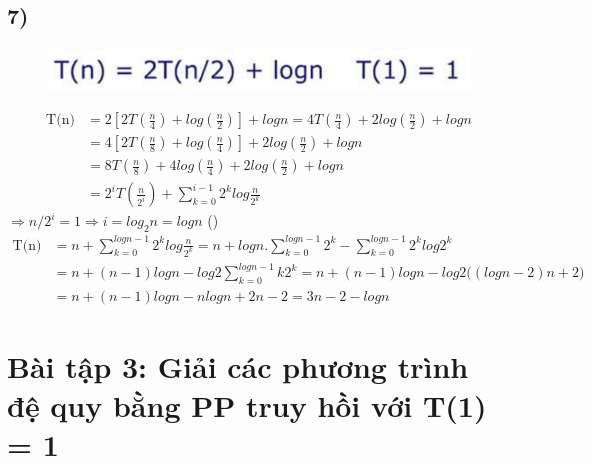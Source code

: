 \documentclass[10pt,a4paper]{article}
\begin{document}
\subsection*{7)}
\begin{figure}[H]
    \centering
    \includegraphics[scale=.7]{images/27.png}
    \label{fig:my_label}
\end{figure}
\begin{align*}
    \text{T(n)}
    & = 2[2T(\frac{n}{4})+log(\frac{n}{2})] + logn = 4T(\frac{n}{4}) + 2log(\frac{n}{2}) + logn \\
    & = 4[2T(\frac{n}{8})+log(\frac{n}{4})] + 2log(\frac{n}{2}) + logn \\ 
    & = 8T(\frac{n}{8}) + 4log(\frac{n}{4})+ 2log(\frac{n}{2}) + logn \\
    & = 2^iT(\frac{n}{2^i})+ \sum_{k=0}^{i-1}{2^klog\frac{n}{2^k}}
\end{align*}
$\Rightarrow n/2^i = 1 \Rightarrow i = log_2{n} = logn$ ()\\
\begin{align*}
    \text{T(n)} 
    & = n + \sum_{k=0}^{logn-1}{2^klog\frac{n}{2^k}} = n+ logn.\sum_{k=0}^{logn-1}{2^k} - \sum_{k=0}^{logn-1}{2^klog2^k} \\
    & = n + (n-1)logn -log2\sum_{k=0}^{logn-1}{k2^k}  = n + (n-1)logn - log2\big((logn-2)n + 2\big) \\
    & = n + (n-1)logn - nlogn + 2n - 2 = 3n - 2 -logn 
\end{align*}
\section*{Bài tập 3: Giải các phương trình đệ quy bằng PP truy hồi với T(1) = 1} 
\end{document}
